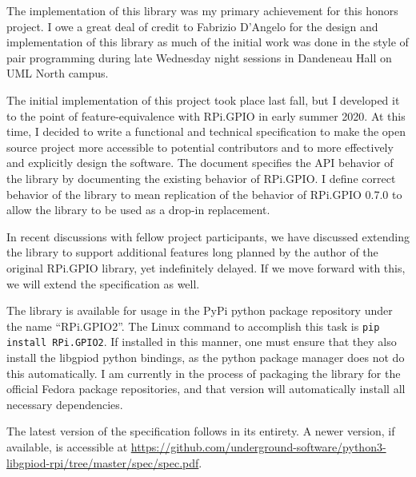 \documentclass{article}
\begin{document}
The implementation of this library
was my primary achievement for this honors project.
I owe a great deal of credit
to Fabrizio D'Angelo
for the design and implementation
of this library
as much of the initial work
was done in the style of pair programming
during late Wednesday night sessions
in Dandeneau Hall on UML North campus.

The initial implementation of this project
took place last fall,
but I developed it to the point
of feature-equivalence
with RPi.GPIO in early summer 2020.
At this time,
I decided to write
a functional and technical specification
to make the open source project more accessible
to potential contributors
and to more effectively and explicitly
design the software.
The document specifies the API behavior of the library
by documenting the existing behavior of RPi.GPIO.
I define correct behavior of the library
to mean replication of the behavior of RPi.GPIO 0.7.0
to allow the library to be used as a drop-in replacement.

In recent discussions with fellow project participants,
we have discussed extending the library
to support additional features
long planned by the author of the original RPi.GPIO library,
yet indefinitely delayed.
If we move forward with this,
we will extend the specification as well.

The library is available for usage
in the PyPi python package repository
under the name ``RPi.GPIO2''.
The Linux command to accomplish this task
is \texttt{pip install RPi.GPIO2}.
If installed in this manner,
one must ensure that they also
install the libgpiod python bindings,
as the python package manager
does not do this automatically.
I am currently in the process
of packaging the library for
the official Fedora package repositories,
and that version will automatically
install all necessary dependencies.

The latest version of the specification follows in its entirety.
A newer version, if available, is accessible at
\url{https://github.com/underground-software/python3-libgpiod-rpi/tree/master/spec/spec.pdf}.






\end{document}
